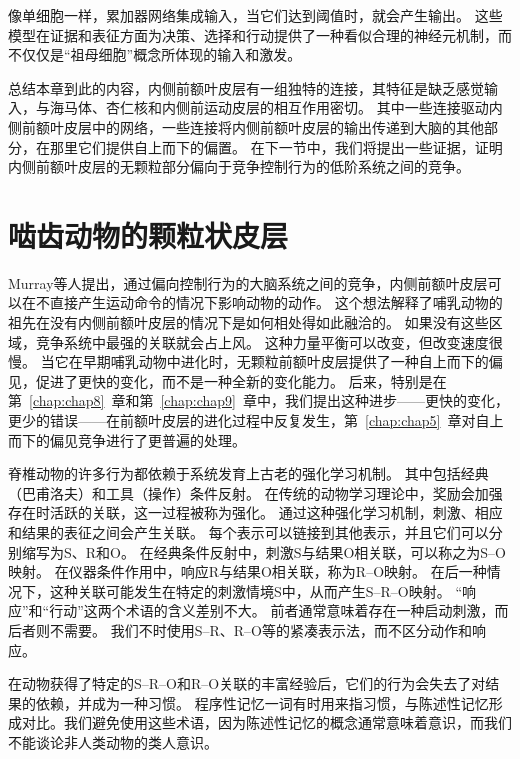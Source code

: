 像单细胞一样，累加器网络集成输入，当它们达到阈值时，就会产生输出。
这些模型在证据和表征方面为决策、选择和行动提供了一种看似合理的神经元机制，而不仅仅是“祖母细胞”概念所体现的输入和激发。\par


总结本章到此的内容，内侧前额叶皮层有一组独特的连接，其特征是缺乏感觉输入，与海马体、杏仁核和内侧前运动皮层的相互作用密切。
其中一些连接驱动内侧前额叶皮层中的网络，一些连接将内侧前额叶皮层的输出传递到大脑的其他部分，在那里它们提供自上而下的偏置。
在下一节中，我们将提出一些证据，证明内侧前额叶皮层的无颗粒部分偏向于竞争控制行为的低阶系统之间的竞争。\par



\section{啮齿动物的颗粒状皮层}

Murray等人\cite{murray2011can}提出，通过偏向控制行为的大脑系统之间的竞争，内侧前额叶皮层可以在不直接产生运动命令的情况下影响动物的动作。
这个想法解释了哺乳动物的祖先在没有内侧前额叶皮层的情况下是如何相处得如此融洽的。
如果没有这些区域，竞争系统中最强的关联就会占上风。 这种力量平衡可以改变，但改变速度很慢。
当它在早期哺乳动物中进化时，无颗粒前额叶皮层提供了一种自上而下的偏见，促进了更快的变化，而不是一种全新的变化能力。
后来，特别是在第~\ref{chap:chap8}~章和第~\ref{chap:chap9}~章中，我们提出这种进步——更快的变化，更少的错误——在前额叶皮层的进化过程中反复发生，第~\ref{chap:chap5}~章对自上而下的偏见竞争进行了更普遍的处理。\par


脊椎动物的许多行为都依赖于系统发育上古老的强化学习机制。
其中包括经典（巴甫洛夫）和工具（操作）条件反射\cite{dickinson1980contemporary}。
在传统的动物学习理论中，奖励会加强存在时活跃的关联，这一过程被称为强化。
通过这种强化学习机制，刺激、相应和结果的表征之间会产生关联。
每个表示可以链接到其他表示，并且它们可以分别缩写为S、R和O。
在经典条件反射中，刺激S与结果O相关联，可以称之为S–O映射。
在仪器条件作用中，响应R与结果O相关联，称为R–O映射。
在后一种情况下，这种关联可能发生在特定的刺激情境S中，从而产生S–R–O映射。
“响应”和“行动”这两个术语的含义差别不大。
前者通常意味着存在一种启动刺激，而后者则不需要。
我们不时使用S–R、R–O等的紧凑表示法，而不区分动作和响应。\par


在动物获得了特定的S–R–O和R–O关联的丰富经验后，它们的行为会失去了对结果的依赖，并成为一种习惯。
程序性记忆一词有时用来指习惯，与陈述性记忆形成对比。我们避免使用这些术语，因为陈述性记忆的概念通常意味着意识，而我们不能谈论非人类动物的类人意识。\par



